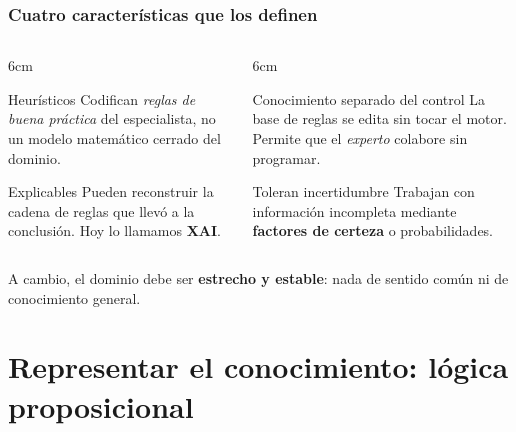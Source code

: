 \documentclass[aspectratio=169, 10pt]{beamer}
\begin{document}
\begin{frame}
\frametitle{Cuatro características que los definen}
\begin{columns}[T]
\begin{column}{6cm}
\begin{block}{Heurísticos}
Codifican \emph{reglas de buena pr\'actica} del especialista, no un modelo matem\'atico cerrado del dominio.
\end{block}
\begin{block}{Explicables}
Pueden reconstruir la cadena de reglas que llev\'o a la conclusi\'on. Hoy lo llamamos \textbf{XAI}.
\end{block}
\end{column}
\begin{column}{6cm}
\begin{block}{Conocimiento separado del control}
La base de reglas se edita sin tocar el motor. Permite que el \emph{experto} colabore sin programar.
\end{block}
\begin{block}{Toleran incertidumbre}
Trabajan con informaci\'on incompleta mediante \textbf{factores de certeza} o probabilidades.
\end{block}
\end{column}
\end{columns}
\vspace{0.5em}
\footnotesize A cambio, el dominio debe ser \textbf{estrecho y estable}: nada de sentido com\'un ni de conocimiento general.
\end{frame}

\section{Representar el conocimiento: lógica proposicional}
\end{document}
